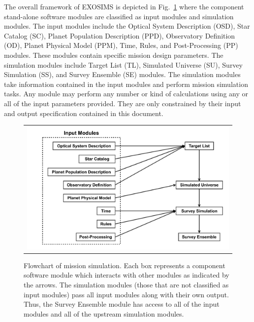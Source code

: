 \documentclass[cleanfoot]{asme2ej}
\begin{document}
The overall framework of EXOSIMS is depicted in Fig.~\ref{figure_framework} where the component stand-alone software modules are classified as input modules and simulation modules.  The input modules include the Optical System Description (OSD), Star Catalog (SC), Planet Population Description (PPD), Observatory Definition (OD), Planet Physical Model (PPM), Time, Rules, and Post-Processing (PP) modules.  These modules contain specific mission design parameters.  The simulation modules include Target List (TL), Simulated Universe (SU), Survey Simulation (SS), and Survey Ensemble (SE) modules.  The simulation modules take information contained in the input modules and perform mission simulation tasks.  Any module may perform any number or kind of calculations using any or all of the input parameters provided.  They are only constrained by their input and output specification contained in this document.

\begin{figure}[ht]
    \begin{center}
        \begin{tabular}{c}
             \includegraphics[width=\textwidth]{codeflow2.pdf}
        \end{tabular}
    \end{center}
    \caption{Flowchart of mission simulation. Each box represents a component software module which interacts with other modules as indicated by the arrows. The simulation modules (those that are not classified as input modules) pass all input modules along with their own output.  Thus, the Survey Ensemble module has access to all of the input modules and all of the upstream simulation modules.}
    \label{figure_framework}
\end{figure}
\end{document}
